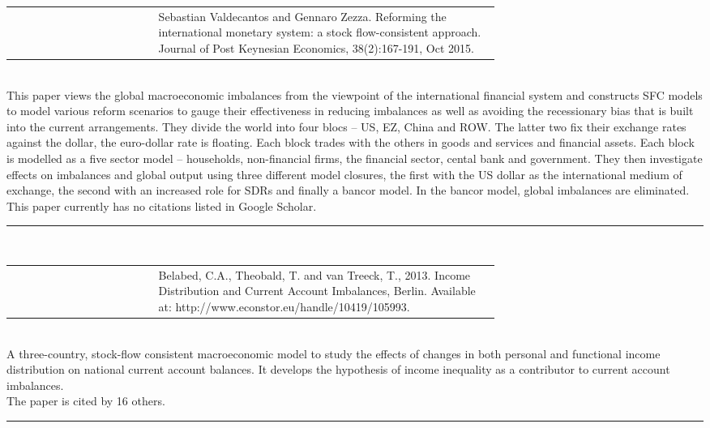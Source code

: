 \documentclass[twoside,a4paper,11pt]{article}
\begin{document}
\begin{tabular}{lp{0.7\linewidth}}
\cite{Valdecantos2015b}  & Sebastian Valdecantos and Gennaro Zezza. Reforming the international monetary system: a stock flow-consistent approach. Journal of Post Keynesian Economics, 38(2):167-191, Oct 2015.
\end{tabular}\\[5pt]
This paper views the global macroeconomic imbalances from  the viewpoint of the international financial system and constructs SFC models to model various reform scenarios to gauge their effectiveness in reducing imbalances as well as avoiding the recessionary bias that is built into the current arrangements. They divide the world into four blocs -- US, EZ, China and ROW. The latter two fix their exchange rates against the dollar, the euro-dollar rate is floating. Each block trades with the others in goods and services and financial assets. Each block is modelled  as a five sector model -- households, non-financial firms, the financial sector, cental bank and government. They then investigate effects on imbalances and global output using three different model closures, the first with the US dollar as the international medium of exchange, the second with an increased role for SDRs and finally a bancor model. In the bancor model, global imbalances are eliminated.\\[5pt]
This paper currently has no citations listed in Google Scholar.\\
\begin{center}
\rule{10cm}{1pt}   \\[5pt]
\end{center}


\begin{tabular}{lp{0.7\linewidth}}
\cite{Belabed2014} & Belabed, C.A., Theobald, T. and van Treeck, T., 2013. Income Distribution and Current Account Imbalances, Berlin. Available at: http://www.econstor.eu/handle/10419/105993.
\end{tabular}\\[5pt]
A three-country, stock-flow consistent macroeconomic model to study the effects of changes in both personal and functional income distribution on national current account balances. It develops the hypothesis of income inequality as a contributor to current account imbalances.\\[5pt]
The paper is cited by 16 others.\\
\begin{center}
\rule{10cm}{1pt}   \\[5pt]
\end{center}
\end{document}
